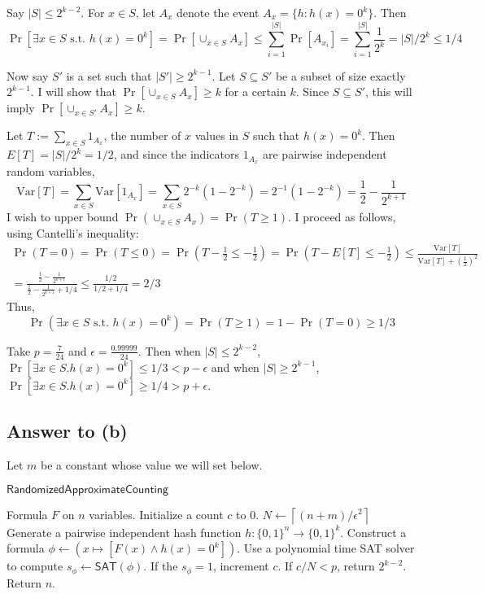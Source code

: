 \documentclass{article}
\begin{document}
Say $|S| \leq 2^{k - 2}$.
For $x \in S$, let $A_x$ denote the event $A_x = \{h : h(x) = 0^k\}$.
Then 
$$
	\Pr[\exists x \in S \text{ s.t. } h(x) = 0^k]
	= \Pr[\cup_{x \in S} A_x]
	\leq
	\sum_{i=1}^{|S|} \Pr[A_{x_i}]
	= \sum_{i=1}^{|S|} \frac{1}{2^k}
	= |S|/2^k
	\leq 1/4
$$

\medskip
\noindent
Now say $S'$ is a set such that $|S'| \geq 2^{k-1}$.
Let $S \subseteq S'$ be a subset of size exactly $2^{k-1}$.
I will show that $\Pr[\cup_{x \in S}A_x] \geq k$ for a certain $k$.
Since $S \subseteq S'$, this will imply $\Pr[\cup_{x \in S'}A_x] \geq k$.

Let $T := \sum_{x \in S}1_{A_x}$, the number of $x$ values in $S$ such that $h(x) = 0^k$.
Then $E[T] = |S|/2^k = 1/2$, and
since the indicators $1_{A_x}$ are pairwise independent random variables,
$$
\text{Var}[T] = \sum_{x \in S} \text{Var}[1_{A_x}]
= \sum_{x \in S} 2^{-k}(1 - 2^{-k})
= 2^{-1}(1 - 2^{-k}) = \frac{1}{2} - \frac{1}{2^{k+1}}
$$
I wish to upper bound $\Pr(\cup_{x \in S} A_x) = \Pr(T \geq 1)$.
I proceed as follows, using Cantelli's inequality:
\begin{multline*}
\Pr(T = 0) =
\Pr(T \leq 0) = \Pr(T - \frac{1}{2} \leq -\frac{1}{2}) = \Pr(T - E[T] \leq -\frac{1}{2})
\leq \frac{\text{Var}[T]}{\text{Var}[T] + (\frac{1}{2})^2} \\
= \frac{\frac{1}{2} - \frac{1}{2^{k+1}}}{
	\frac{1}{2} - \frac{1}{2^{k+1}} + 1/4
} \leq \frac{1/2}{1/2 + 1/4} = 2/3
\end{multline*}
Thus,
$$
\Pr(\exists x \in S \text{ s.t. } h(x) = 0^k) = \Pr(T \geq 1) = 1 - \Pr(T = 0) \geq 1/3
$$

\medskip
\noindent
Take $p = \frac{7}{24}$ and $\epsilon = \frac{0.99999}{24}$.
Then when $|S| \leq 2^{k-2}$, $\Pr[\exists x \in S . h(x) =0^k] \leq 1/3 < p - \epsilon$
and when $|S| \geq 2^{k-1}$, $\Pr[\exists x \in S . h(x) =0^k] \geq 1/4 > p + \epsilon$.

\subsection*{Answer to (b)}

Let $m$ be a constant whose value we will set below.

\begin{algorithm}{$\mathsf{RandomizedApproximateCounting}$}
\begin{algorithmic}[1]
\Require Formula $F$ on $n$ variables.
 \label{line:inner_for}
	\State Initialize a count $c$ to $0$.
	\State $N \gets \left \lceil{(n + m)/\epsilon^2}\right \rceil$
		\State Generate a pairwise independent hash function $h : \{0, 1\}^n \to \{0, 1\}^k$.
		\State Construct a formula $\phi \gets (x \mapsto [F(x) \wedge h(x) = 0^k])$.
		\State Use a polynomial time SAT solver to compute $s_\phi \gets \mathsf{SAT}(\phi)$.
		\State If the $s_\phi = 1$, increment $c$.
	\EndFor \label{line:end_inner_for}
	\State If $c / N < p$, return $2^{k-2}$. \label{line:return}
\EndFor
\State Return $n$.
\end{algorithmic}
\end{algorithm}
\end{document}
